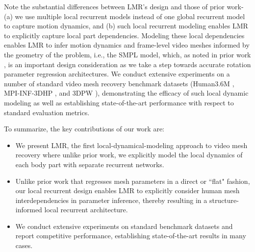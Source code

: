 \documentclass[10pt,twocolumn,letterpaper]{article}
\begin{document}
Note the substantial differences between LMR's design and those of prior work- (a) we use multiple local recurrent models instead of one global recurrent model to capture motion dynamics, and (b) such local recurrent modeling enables LMR to explicitly capture local part dependencies. Modeling these local dependencies enables LMR to infer motion dynamics and frame-level video meshes informed by the geometry of the problem, i.e., the SMPL model, which, as noted in prior work \cite{kendall2017geometric}, is an important design consideration as we take a step towards accurate rotation parameter regression architectures. We conduct extensive experiments on a number of standard video mesh recovery benchmark datasets (Human3.6M \cite{ionescu2013human3}, MPI-INF-3DHP \cite{mehta2017monocular}, and 3DPW \cite{von2018recovering}), demonstrating the efficacy of such local dynamic modeling as well as establishing state-of-the-art performance with respect to standard evaluation metrics. 

To summarize, the key contributions of our work are:

\begin{itemize}
    \item We present LMR, the first local-dynamical-modeling approach to video mesh recovery where unlike prior work, we explicitly model the local dynamics of each body part with separate recurrent networks.
    \item Unlike prior work that regresses mesh parameters in a direct or ``flat" fashion, our local recurrent design enables LMR to explicitly consider human mesh interdependencies in parameter inference, thereby resulting in a structure-informed local recurrent architecture.
    \item We conduct extensive experiments on standard benchmark datasets and report competitive performance, establishing state-of-the-art results in many cases.
\end{itemize}
\end{document}
